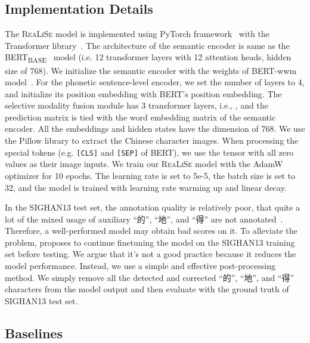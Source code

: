 \documentclass[11pt,a4paper]{article}
\newcommand\model{\textsc{ReaLiSe}}
\begin{document}
\subsection{Implementation Details}
\label{ssec:details}
The \model{} model is implemented using PyTorch framework~\citep{pytorch} with the Transformer library~\citep{hug-trans}. The architecture of the semantic encoder is same as the BERT\textsubscript{BASE}~\citep{bert} model (i.e. 12 transformer layers with 12 attention heads, hidden size of 768). We initialize the semantic encoder with the weights of BERT-wwm model~\citep{bert-wwm}.
For the phonetic sentence-level encoder, we set the number of layers to 4, and initialize its position embedding with BERT's position embedding.
The selective modality fusion module has 3 transformer layers, i.e., , and the prediction matrix  is tied with the word embedding matrix of the semantic encoder.
All the embeddings and hidden states have the dimension of 768. 
We use the Pillow library to extract the Chinese character images. When processing the special tokens (e.g. \texttt{[CLS]} and \texttt{[SEP]} of BERT), we use the tensor with all zero values as their image inputs.
We train our \model{} model with the AdamW~\citep{adamw} optimizer for 10 epochs. The learning rate is set to 5e-5, the batch size is set to 32, and the model is trained with learning rate warming up and linear decay.

\begin{CJK*}{UTF8}{gbsn}
In the SIGHAN13 test set, the  annotation quality is relatively poor, that quite a lot of the mixed usage of auxiliary ``的'', ``地'', and ``得'' are not annotated~\citep{spellgcn}. Therefore, a well-performed model may obtain bad scores on it. To alleviate the problem, \citet{spellgcn} proposes to continue finetuning the model on the SIGHAN13 training set before testing. We argue that it's not a good practice because it reduces the model performance. Instead, we use a simple and effective post-processing method. We simply remove all the detected and corrected ``的'', ``地'', and ``得'' characters from the model output and then evaluate with the ground truth of SIGHAN13 test set. 


\end{CJK*}






\subsection{Baselines}
\end{document}
